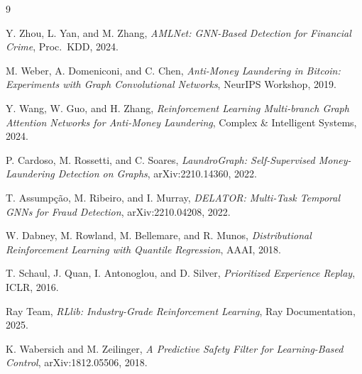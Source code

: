 \documentclass[11pt,a4paper]{article}
\begin{document}
\begin{thebibliography}{9}

Y. Zhou, L. Yan, and M. Zhang,
\textit{AMLNet: GNN-Based Detection for Financial Crime},
Proc.\ KDD, 2024.

M. Weber, A. Domeniconi, and C. Chen,
\textit{Anti-Money Laundering in Bitcoin: Experiments with Graph Convolutional Networks},
NeurIPS Workshop, 2019.

Y. Wang, W. Guo, and H. Zhang,
\textit{Reinforcement Learning Multi-branch Graph Attention Networks for Anti-Money Laundering},
Complex \& Intelligent Systems, 2024.

P. Cardoso, M. Rossetti, and C. Soares,
\textit{LaundroGraph: Self-Supervised Money-Laundering Detection on Graphs},
arXiv:2210.14360, 2022.

T. Assumpção, M. Ribeiro, and I. Murray,
\textit{DELATOR: Multi-Task Temporal GNNs for Fraud Detection},
arXiv:2210.04208, 2022.

W. Dabney, M. Rowland, M. Bellemare, and R. Munos,
\textit{Distributional Reinforcement Learning with Quantile Regression},
AAAI, 2018.

T. Schaul, J. Quan, I. Antonoglou, and D. Silver,
\textit{Prioritized Experience Replay},
ICLR, 2016.

Ray Team,
\textit{RLlib: Industry-Grade Reinforcement Learning},
Ray Documentation, 2025.

K. Wabersich and M. Zeilinger,
\textit{A Predictive Safety Filter for Learning-Based Control},
arXiv:1812.05506, 2018.

\end{thebibliography}
\end{document}
